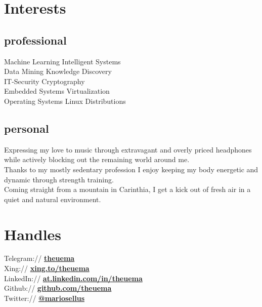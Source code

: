 \documentclass[]{resume}
\begin{document}
\begin{minipage}[t]{0.33\textwidth}
\section{Interests} 
	\subsection{professional}
	Machine Learning \textbullet{} Intelligent Systems\\ 
	Data Mining \textbullet{} Knowledge Discovery\\
	IT-Security \textbullet{} Cryptography\\
	Embedded Systems \textbullet{} Virtualization\\
	Operating Systems \textbullet{} Linux Distributions\\
	\sectionsep

	\subsection{personal}
	Expressing my love to music through extravagant and overly priced headphones while actively blocking out the remaining world around me. \\ \sectionsep
	Thanks to my mostly sedentary profession I enjoy keeping my body energetic and dynamic through strength training. \\ \sectionsep 
	Coming straight from a mountain in Carinthia, I get a kick out of fresh air in a quiet and natural environment. 
	\sectionsep
\section{Handles} 
	Telegram:// \href{https://telegram.me/theuema}{\textbf{theuema}} \\ \smallsep 
	Xing:// \href{https://www.xing.com/profile/Mario_Theuermann}{\textbf{xing.to/theuema}} \\ \smallsep 
	LinkedIn:// \href{https://www.linkedin.com/in/theuema}{\textbf{at.linkedin.com/in/theuema}} \\ \smallsep 
	Github:// \href{https://github.com/theuema}{\textbf{github.com/theuema}} \\ \smallsep 
	Twitter:// \href{https://twitter.com/mariosellus}{\textbf{@mariosellus}} \\ \smallsep 

\end{minipage}\quad %
\end{document}
